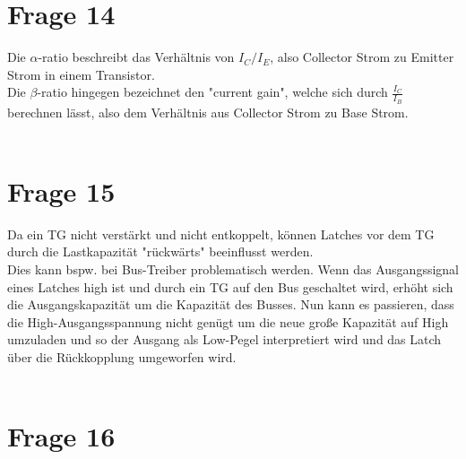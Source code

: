 \documentclass[a4paper]{scrartcl}
\begin{document}
\section*{Frage 14}
Die $\alpha$-ratio beschreibt das Verhältnis von $I_C/I_E$, also Collector Strom zu Emitter Strom in einem Transistor.\\
Die $\beta$-ratio hingegen bezeichnet den "current gain", welche sich durch $\frac{I_C}{I_B}$ berechnen lässt, also dem Verhältnis aus Collector Strom zu Base Strom.
~\\
~\\
\section*{Frage 15}
Da ein TG nicht verstärkt und nicht entkoppelt, können Latches vor dem TG durch die Lastkapazität "rückwärts" beeinflusst werden.\\
Dies kann bspw. bei Bus-Treiber problematisch werden. Wenn das Ausgangssignal eines Latches high ist und durch ein TG auf den Bus geschaltet wird, erhöht sich die Ausgangskapazität um die Kapazität des Busses. Nun kann es passieren, dass die High-Ausgangsspannung nicht genügt um die neue große Kapazität auf High umzuladen und so der Ausgang als Low-Pegel interpretiert wird und das Latch über die Rückkopplung umgeworfen wird.
~\\
~\\
\section*{Frage 16}

~\\
~\\
\end{document}
